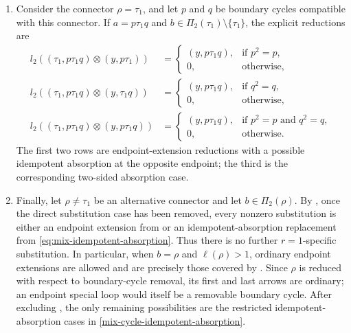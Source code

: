 \documentclass[11pt,a4paper,reqno]{amsart}
\newcommand{\para}[2]{(#1,#2)}
\theoremstyle{plain}
\theoremstyle{definition}
\numberwithin{equation}{section}
\begin{document}
\begin{enumerate}
		\item Consider the connector $\rho=\tau_1$, and let $p$ and $q$ be boundary
		cycles compatible with this connector.  If $a=p\tau_1q$ and
		$b\in\Pi_2(\tau_1)\setminus\{\tau_1\}$, the explicit reductions are
		\begin{align}
			l_2(\para{\tau_1}{p\tau_1q}\otimes\para{y}{p\tau_1})
			&=
			\begin{cases}
				\para{y}{p\tau_1q},&\text{if }p^2=p,\\
				0,&\text{otherwise,}
			\end{cases}\\
			l_2(\para{\tau_1}{p\tau_1q}\otimes\para{y}{\tau_1q})
			&=
			\begin{cases}
				\para{y}{p\tau_1q},&\text{if }q^2=q,\\
				0,&\text{otherwise,}
			\end{cases}\\
			l_2(\para{\tau_1}{p\tau_1q}\otimes\para{y}{p\tau_1q})
			&=
			\begin{cases}
				\para{y}{p\tau_1q},&\text{if }p^2=p\text{ and }q^2=q,\\
				0,&\text{otherwise.}
			\end{cases}
		\end{align}
		The first two rows are endpoint-extension reductions with a possible
		idempotent absorption at the opposite endpoint; the third is the corresponding
		two-sided absorption case.
		
		\item Finally, let $\rho\neq\tau_1$ be an alternative connector and let
		$b\in\Pi_2(\rho)$.  By , once the direct
		substitution case has been removed, every nonzero substitution is either an
		endpoint extension from  or an
		idempotent-absorption replacement from
		\eqref{eq:mix-idempotent-absorption}.  Thus there is no further
		$r=1$-specific substitution.  In particular, when $b=\rho$ and
		$\ell(\rho)>1$, ordinary endpoint extensions are allowed and are precisely
		those covered by .  Since $\rho$
		is reduced with respect to boundary-cycle removal, its first and last arrows
		are ordinary; an endpoint special loop would itself be a removable boundary
		cycle.  After excluding , the only remaining
		possibilities are the restricted idempotent-absorption cases in
		\eqref{mix-cycle-idempotent-absorption}.
	\end{enumerate}
	
\end{document}
